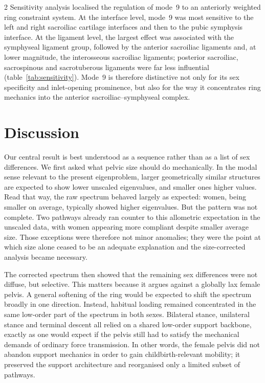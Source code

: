 \documentclass[openacc]{rsproca_new}
\begin{document}
\begin{multicols}{2}
Sensitivity analysis localised the regulation of mode~9 to an anteriorly weighted ring constraint system. At the interface level, mode~9 was most sensitive to the left and right sacroiliac cartilage interfaces and then to the pubic symphysis interface. At the ligament level, the largest effect was associated with the symphyseal ligament group, followed by the anterior sacroiliac ligaments and, at lower magnitude, the interosseous sacroiliac ligaments; posterior sacroiliac, sacrospinous and sacrotuberous ligaments were far less influential (table~\ref{tab:sensitivity}). Mode~9 is therefore distinctive not only for its sex specificity and inlet-opening prominence, but also for the way it concentrates ring mechanics into the anterior sacroiliac--symphyseal complex.
\section{Discussion}

Our central result is best understood as a sequence rather than as a list of sex differences. We first asked what pelvic size should do mechanically. In the modal sense relevant to the present eigenproblem, larger geometrically similar structures are expected to show lower unscaled eigenvalues, and smaller ones higher values. Read that way, the raw spectrum behaved largely as expected: women, being smaller on average, typically showed higher eigenvalues. But the pattern was not complete. Two pathways already ran counter to this allometric expectation in the unscaled data, with women appearing more compliant despite smaller average size. Those exceptions were therefore not minor anomalies; they were the point at which size alone ceased to be an adequate explanation and the size-corrected analysis became necessary.

The corrected spectrum then showed that the remaining sex differences were not diffuse, but selective. This matters because it argues against a globally lax female pelvis. A general softening of the ring would be expected to shift the spectrum broadly in one direction. Instead, habitual loading remained concentrated in the same low-order part of the spectrum in both sexes. Bilateral stance, unilateral stance and terminal descent all relied on a shared low-order support backbone, exactly as one would expect if the pelvis still had to satisfy the mechanical demands of ordinary force transmission. In other words, the female pelvis did not abandon support mechanics in order to gain childbirth-relevant mobility; it preserved the support architecture and reorganised only a limited subset of pathways.


\end{multicols}
\end{document}
